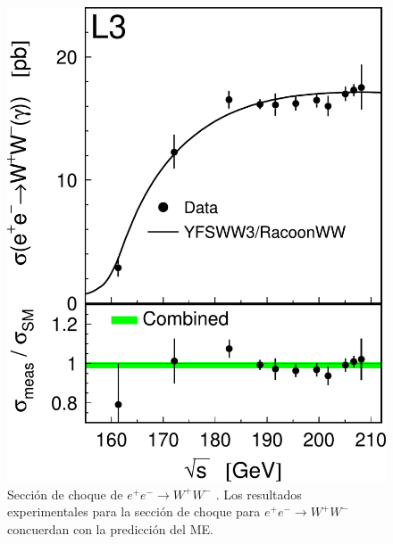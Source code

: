 \begin{figure}[h!]
\centering
\includegraphics[scale=0.35]{Images/SM-test-6.pdf}
\caption[Sección de choque de $e^+e^- \to W^+W^-$]{Sección de choque de $e^+e^- \to W^+W^-$ \cite{achard2004measurement}. Los resultados experimentales para la sección de choque para $e^+e^- \to W^+W^-$ concuerdan con la predicción del ME.}
\label{SMt3}
\end{figure}

